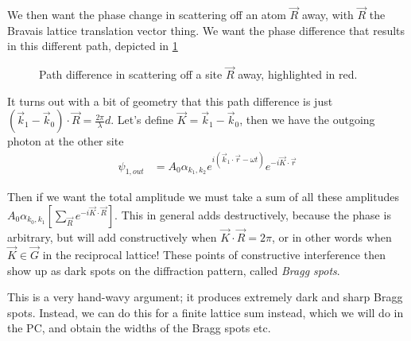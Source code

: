 \documentclass[10pt]{report}
\begin{document}
We then want the phase change in scattering off an atom $\vec{R}$ away, with $\vec{R}$ the Bravais lattice translation vector thing. We want the phase difference that results in this different path, depicted in \ref{01.10.1}
\begin{figure}[!h]
    \centering
    \caption{Path difference in scattering off a site $\vec{R}$ away, highlighted in red.}
    \label{01.10.1}
\end{figure}

It turns out with a bit of geometry that this path difference is just $\left( \vec{k}_1 - \vec{k}_0 \right) \cdot \vec{R} = \frac{2\pi}{\lambda} d$. Let's define $\vec{K} = \vec{k}_1 - \vec{k}_0$, then we have the outgoing photon at the other site
\begin{align}
    \psi_{1,out} &= A_0 \alpha_{k_1, k_2} e^{i\left( \vec{k}_1 \cdot \vec{r} - \omega t \right)} e^{-i\vec{K} \cdot \vec{r}}
\end{align}

Then if we want the total amplitude we must take a sum of all these amplitudes $A_0 \alpha_{k_0, k_1}\left[ \sum\limits_{\vec{R}}^{}e^{-i\vec{K} \cdot \vec{R}} \right]$. This in general adds destructively, because the phase is arbitrary, but will add constructively when $\vec{K} \cdot \vec{R} = 2\pi$, or in other words when $\vec{K} \in \vec{G}$ in the reciprocal lattice! These points of constructive interference then show up as dark spots on the diffraction pattern, called \emph{Bragg spots}.

This is a very hand-wavy argument; it produces extremely dark and sharp Bragg spots. Instead, we can do this for a finite lattice sum instead, which we will do in the PC, and obtain the widths of the Bragg spots etc.
\end{document}

